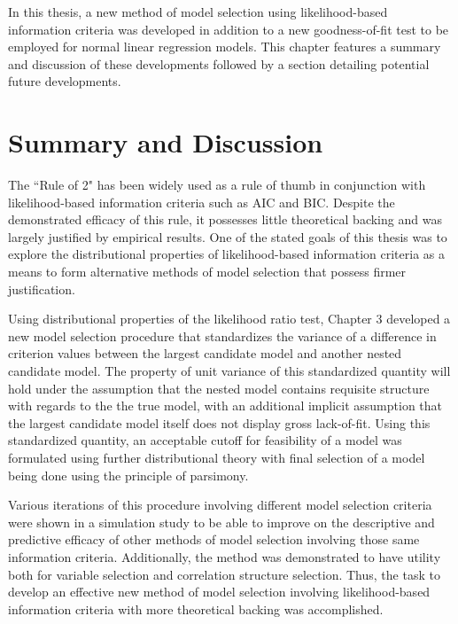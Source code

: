 \doublespace
{}

		In this thesis, a new method of model selection using likelihood-based information criteria was developed in addition to a new goodness-of-fit test
		to be employed for normal linear regression models. This chapter features a summary and discussion of these developments followed by a section
		detailing potential future developments. 

		\section{Summary and Discussion}

		The ``Rule of 2" has been widely used as a rule of thumb in conjunction with likelihood-based information criteria such as AIC and BIC. Despite the
		demonstrated efficacy of this rule, it possesses little theoretical backing and was largely justified by empirical results. One of the stated
		goals of this thesis was to explore the distributional properties of likelihood-based information criteria as a means to form alternative methods of
		model selection that possess firmer justification.
		
		Using distributional properties of the likelihood ratio test, Chapter 3 developed a new model selection procedure that standardizes the variance of
		a difference in criterion values between the largest candidate model and another nested candidate model. The property of unit variance of this
		standardized quantity will hold under the assumption that the nested model contains requisite structure with regards to the the true model, with an additional
		implicit assumption that the largest candidate model itself does not display gross lack-of-fit. Using this standardized quantity, an acceptable
		cutoff for feasibility of a model was formulated using further distributional theory with final selection of a model being done using the principle
		of parsimony.

		Various iterations of this procedure involving different model selection criteria were shown in a simulation study to be able to improve on the descriptive
		and predictive efficacy of other methods of model selection involving those same information criteria.  Additionally, the method was demonstrated to
		have utility both for variable selection and correlation structure selection. Thus, the task to develop an effective new method of model selection
		involving likelihood-based information criteria with more theoretical backing was accomplished.

